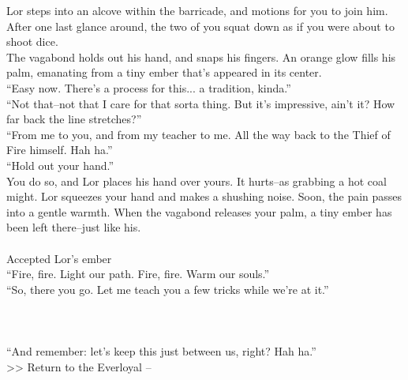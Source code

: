 Lor steps into an alcove within the barricade, and motions for you to join him. After one last glance around, the two of you squat down as if you were about to shoot dice.\\

The vagabond holds out his hand, and snaps his fingers. An orange glow fills his palm, emanating from a tiny ember that’s appeared in its center.\\

“Easy now. There’s a process for this... a tradition, kinda.”\\

“Not that--not that I care for that sorta thing. But it’s impressive, ain’t it? How far back the line stretches?”\\

“From me to you, and from my teacher to me. All the way back to the Thief of Fire himself. Hah ha.”\\

“Hold out your hand.”\\

You do so, and Lor places his hand over yours. It hurts--as grabbing a hot coal might. Lor squeezes your hand and makes a shushing noise. Soon, the pain passes into a gentle warmth. When the vagabond releases your palm, a tiny ember has been left there--just like his.\\
\\
 Accepted Lor’s ember\\

“Fire, fire. Light our path. Fire, fire. Warm our souls.”\\

“So, there you go. Let me teach you a few tricks while we’re at it.”\\
\\
\\
\\

“And remember: let’s keep this just between us, right? Hah ha.”\\

>> Return to the Everloyal -- 